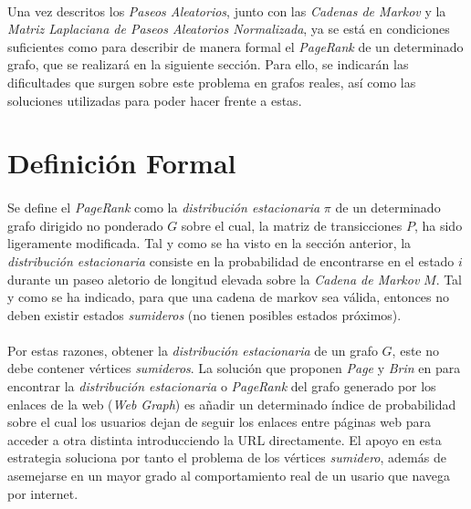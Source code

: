 \documentclass{subfiles}
\begin{document}
      \paragraph{}
      Una vez descritos los \emph{Paseos Aleatorios}, junto con las \emph{Cadenas de Markov} y la \emph{Matriz Laplaciana de Paseos Aleatorios Normalizada}, ya se está en condiciones suficientes como para describir de manera formal el \emph{PageRank} de un determinado grafo, que se realizará en la siguiente sección. Para ello, se indicarán las dificultades que surgen sobre este problema en grafos reales, así como las soluciones utilizadas para poder hacer frente a estas.

    \section{Definición Formal}
    \label{sec:pagerank_formal_definition}

      \paragraph{}
      Se define el \emph{PageRank} como la \emph{distribución estacionaria} $\pi$ de un determinado grafo dirigido no ponderado $G$ sobre el cual, la matriz de transicciones $P$, ha sido ligeramente modificada. Tal y como se ha visto en la sección anterior, la \emph{distribución estacionaria} consiste en la probabilidad de encontrarse en el estado $i$ durante un paseo aletorio de longitud elevada sobre la \emph{Cadena de Markov} $M$. Tal y como se ha indicado, para que una cadena de markov sea válida, entonces no deben existir estados \emph{sumideros} (no tienen posibles estados próximos).

      \paragraph{}
      Por estas razones, obtener la \emph{distribución estacionaria} de un grafo $G$, este no debe contener vértices \emph{sumideros}. La solución que proponen \emph{Page} y \emph{Brin} en \cite{page1999pagerank} para encontrar la \emph{distribución estacionaria} o \emph{PageRank} del grafo generado por los enlaces de la web (\emph{Web Graph}) es añadir un determinado índice de probabilidad sobre el cual los usuarios dejan de seguir los enlaces entre páginas web para acceder a otra distinta introducciendo la URL directamente. El apoyo en esta estrategia soluciona por tanto el problema de los vértices \emph{sumidero}, además de asemejarse en un mayor grado al comportamiento real de un usario que navega por internet.
\end{document}
